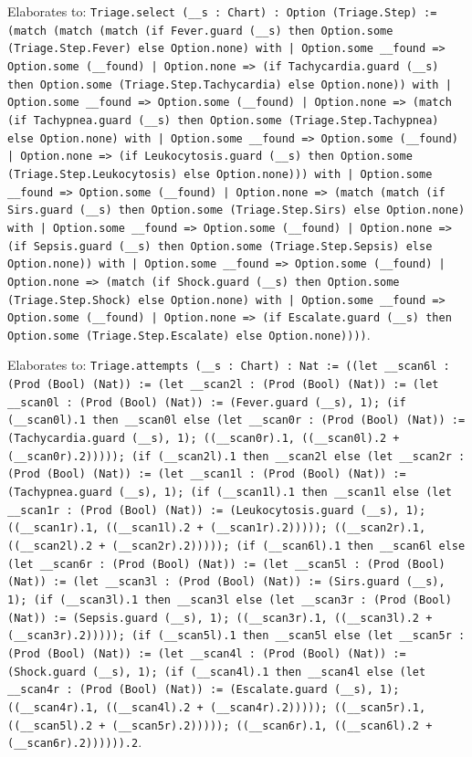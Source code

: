 \documentclass[11pt]{article}
\begin{document}
\noindent Elaborates to: \texttt{Triage.select (\_\_s : Chart) : Option (Triage.Step) := (match (match (match (if Fever.guard (\_\_s) then Option.some (Triage.Step.Fever) else Option.none) with | Option.some \_\_found => Option.some (\_\_found) | Option.none => (if Tachycardia.guard (\_\_s) then Option.some (Triage.Step.Tachycardia) else Option.none)) with | Option.some \_\_found => Option.some (\_\_found) | Option.none => (match (if Tachypnea.guard (\_\_s) then Option.some (Triage.Step.Tachypnea) else Option.none) with | Option.some \_\_found => Option.some (\_\_found) | Option.none => (if Leukocytosis.guard (\_\_s) then Option.some (Triage.Step.Leukocytosis) else Option.none))) with | Option.some \_\_found => Option.some (\_\_found) | Option.none => (match (match (if Sirs.guard (\_\_s) then Option.some (Triage.Step.Sirs) else Option.none) with | Option.some \_\_found => Option.some (\_\_found) | Option.none => (if Sepsis.guard (\_\_s) then Option.some (Triage.Step.Sepsis) else Option.none)) with | Option.some \_\_found => Option.some (\_\_found) | Option.none => (match (if Shock.guard (\_\_s) then Option.some (Triage.Step.Shock) else Option.none) with | Option.some \_\_found => Option.some (\_\_found) | Option.none => (if Escalate.guard (\_\_s) then Option.some (Triage.Step.Escalate) else Option.none))))}.\par
\noindent Elaborates to: \texttt{Triage.attempts (\_\_s : Chart) : Nat := ((let \_\_scan6l : (Prod (Bool) (Nat)) := (let \_\_scan2l : (Prod (Bool) (Nat)) := (let \_\_scan0l : (Prod (Bool) (Nat)) := (Fever.guard (\_\_s), 1); (if (\_\_scan0l).1 then \_\_scan0l else (let \_\_scan0r : (Prod (Bool) (Nat)) := (Tachycardia.guard (\_\_s), 1); ((\_\_scan0r).1, ((\_\_scan0l).2 + (\_\_scan0r).2))))); (if (\_\_scan2l).1 then \_\_scan2l else (let \_\_scan2r : (Prod (Bool) (Nat)) := (let \_\_scan1l : (Prod (Bool) (Nat)) := (Tachypnea.guard (\_\_s), 1); (if (\_\_scan1l).1 then \_\_scan1l else (let \_\_scan1r : (Prod (Bool) (Nat)) := (Leukocytosis.guard (\_\_s), 1); ((\_\_scan1r).1, ((\_\_scan1l).2 + (\_\_scan1r).2))))); ((\_\_scan2r).1, ((\_\_scan2l).2 + (\_\_scan2r).2))))); (if (\_\_scan6l).1 then \_\_scan6l else (let \_\_scan6r : (Prod (Bool) (Nat)) := (let \_\_scan5l : (Prod (Bool) (Nat)) := (let \_\_scan3l : (Prod (Bool) (Nat)) := (Sirs.guard (\_\_s), 1); (if (\_\_scan3l).1 then \_\_scan3l else (let \_\_scan3r : (Prod (Bool) (Nat)) := (Sepsis.guard (\_\_s), 1); ((\_\_scan3r).1, ((\_\_scan3l).2 + (\_\_scan3r).2))))); (if (\_\_scan5l).1 then \_\_scan5l else (let \_\_scan5r : (Prod (Bool) (Nat)) := (let \_\_scan4l : (Prod (Bool) (Nat)) := (Shock.guard (\_\_s), 1); (if (\_\_scan4l).1 then \_\_scan4l else (let \_\_scan4r : (Prod (Bool) (Nat)) := (Escalate.guard (\_\_s), 1); ((\_\_scan4r).1, ((\_\_scan4l).2 + (\_\_scan4r).2))))); ((\_\_scan5r).1, ((\_\_scan5l).2 + (\_\_scan5r).2))))); ((\_\_scan6r).1, ((\_\_scan6l).2 + (\_\_scan6r).2)))))).2}.\par
\end{document}
